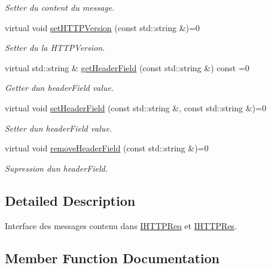 \begin{DoxyCompactItemize}
\begin{DoxyCompactList}\small\item\em Setter du content du message. \end{DoxyCompactList}\item 
virtual void \hyperlink{class_a_p_i_tree_friends_1_1_i_h_t_t_p_mes_a26778131405b9db8213707acdddde46d}{set\+H\+T\+T\+P\+Version} (const std\+::string \&)=0
\begin{DoxyCompactList}\small\item\em Setter du la H\+T\+T\+P\+Version. \end{DoxyCompactList}\item 
virtual std\+::string \& \hyperlink{class_a_p_i_tree_friends_1_1_i_h_t_t_p_mes_a63d43c1de895fc31ddf1c82136f1c66d}{get\+Header\+Field} (const std\+::string \&) const =0
\begin{DoxyCompactList}\small\item\em Getter d\textquotesingle{}un header\+Field value. \end{DoxyCompactList}\item 
virtual void \hyperlink{class_a_p_i_tree_friends_1_1_i_h_t_t_p_mes_af1ed73572f6911e1baf42baef4c1bcba}{set\+Header\+Field} (const std\+::string \&, const std\+::string \&)=0
\begin{DoxyCompactList}\small\item\em Setter d\textquotesingle{}un header\+Field value. \end{DoxyCompactList}\item 
virtual void \hyperlink{class_a_p_i_tree_friends_1_1_i_h_t_t_p_mes_af5158c26db585d25c0d0d5343e54555f}{remove\+Header\+Field} (const std\+::string \&)=0
\begin{DoxyCompactList}\small\item\em Supression d\textquotesingle{}un header\+Field. \end{DoxyCompactList}\end{DoxyCompactItemize}


\subsection{Detailed Description}
Interface des messages contenu dans \hyperlink{class_a_p_i_tree_friends_1_1_i_h_t_t_p_req}{I\+H\+T\+T\+P\+Req} et \hyperlink{class_a_p_i_tree_friends_1_1_i_h_t_t_p_res}{I\+H\+T\+T\+P\+Res}. 

\subsection{Member Function Documentation}
\hypertarget{class_a_p_i_tree_friends_1_1_i_h_t_t_p_mes_af114cd093f3194e88cf3d7b53d5737dd}{}
